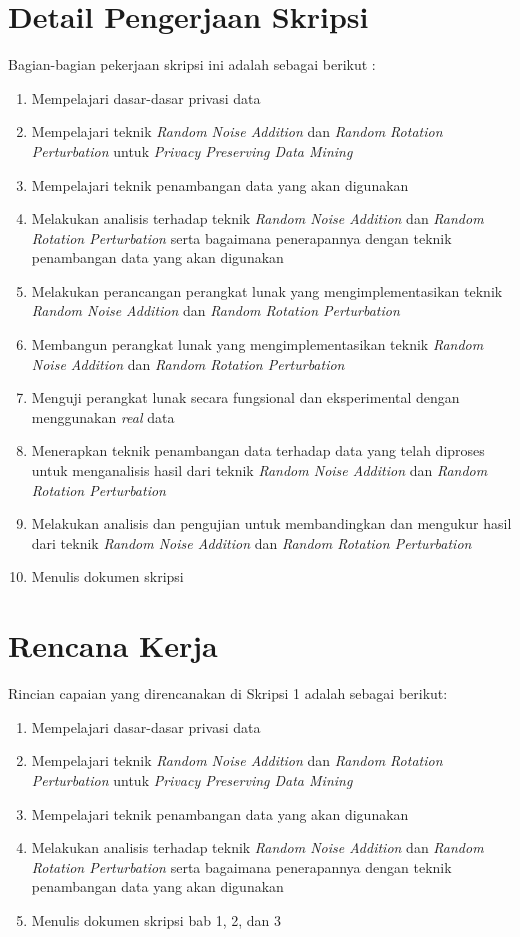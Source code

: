 \documentclass[a4paper,twoside]{article}
\begin{document}
\section{Detail Pengerjaan Skripsi}
Bagian-bagian pekerjaan skripsi ini adalah sebagai berikut :
	\begin{enumerate}
		\item Mempelajari dasar-dasar privasi data
		\item Mempelajari teknik \textit{Random Noise Addition} dan \textit{Random Rotation Perturbation} untuk \textit{Privacy Preserving Data Mining}
		\item Mempelajari teknik penambangan data yang akan digunakan
		\item Melakukan analisis terhadap teknik \textit{Random Noise Addition} dan \textit{Random Rotation Perturbation} serta bagaimana penerapannya dengan teknik penambangan data yang akan digunakan
		\item Melakukan perancangan perangkat lunak yang mengimplementasikan teknik \textit{Random Noise Addition} dan \textit{Random Rotation Perturbation}
		\item Membangun perangkat lunak yang mengimplementasikan teknik \textit{Random Noise Addition} dan \textit{Random Rotation Perturbation}
		\item Menguji perangkat lunak secara fungsional dan eksperimental dengan menggunakan \textit{real} data
		\item Menerapkan teknik penambangan data terhadap data yang telah diproses untuk menganalisis hasil dari teknik \textit{Random Noise Addition} dan \textit{Random Rotation Perturbation}
		\item Melakukan analisis dan pengujian untuk membandingkan dan mengukur hasil dari teknik \textit{Random Noise Addition} dan \textit{Random Rotation Perturbation}
		\item Menulis dokumen skripsi
	\end{enumerate}

\section{Rencana Kerja}
Rincian capaian yang direncanakan di Skripsi 1 adalah sebagai berikut:
\begin{enumerate}
	\item Mempelajari dasar-dasar privasi data
	\item Mempelajari teknik \textit{Random Noise Addition} dan \textit{Random Rotation Perturbation} untuk \textit{Privacy Preserving Data Mining}
	\item Mempelajari teknik penambangan data yang akan digunakan
	\item Melakukan analisis terhadap teknik \textit{Random Noise Addition} dan \textit{Random Rotation Perturbation} serta bagaimana penerapannya dengan teknik penambangan data yang akan digunakan
	\item Menulis dokumen skripsi bab 1, 2, dan 3
\end{enumerate}
\end{document}
